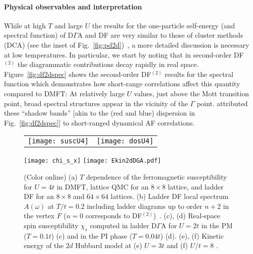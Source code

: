\documentclass[rmp,aps,reprint,amsmath,amssymb,superscriptaddress,showpacs,nofootinbib]{revtex4-1}
\begin{document}
\paragraph*{Physical observables and interpretation}

While at high $T$ and large $U$ the results for the one-particle self-energy (and spectral function) of D$\Gamma$A and DF are very similar to those of cluster methods (DCA) (see the inset of Fig.~\ref{fig:pd2d})~\cite{LeBlanc2015}, a more detailed discussion is necessary at low temperatures. In particular, we start by noting that in second-order  DF$^{(2)}$ the diagrammatic contributions decay rapidly in real space. Figure~\ref{fig:df2dspec} shows the second-order DF$^{(2)}$ results for the spectral function which demonstrates how short-range correlations affect this quantity compared to DMFT: At relatively large $U$ values, just above the Mott transition point, broad spectral structures appear in the vicinity of the $\Gamma$ point.  attributed these ``shadow bands''  [akin to the (red and blue) dispersion in  Fig.~\ref{fig:df2dspec}] to short-ranged dynamical AF correlations.

\begin{figure}[t]
\begin{tabular}{cc}
  \texttt{[image: suscU4]} & \hspace{-0.75em}\texttt{[image: dosU4]}
\end{tabular}
  \texttt{[image: chi\_s\_x]} 
  \texttt{[image: Ekin2dDGA.pdf]} 
    \caption{(Color online) (a) $T$ dependence of the  ferromagnetic susceptibility for $U=4t$ in DMFT, lattice QMC \cite{Moreo1993} for an $8\times 8$ lattice, and ladder DF for an $8\times 8$ and  $64\times 64$ lattices. (b) Ladder DF local spectrum $A(\omega)$ at $T/t=0.2$ including ladder diagrams up to order $n+2$ in the vertex $F$ ($n=0$ corresponds to DF$^{(2)}$)~\cite{Hafermannphd}. (c), (d) Real-space spin susceptibility $\chi_{s}$ computed in ladder D$\Gamma$A for $U=2t$ in the PM ($T=0.1t$) (c) and in the PI  phase ($T=0.04t$) (d). (e), (f) Kinetic energy of the $2d$ Hubbard model at (e) $U=3t$  and (f) $U/t=8$ \cite{Rohringer2016}.}
  \label{fig:observ2d}
\end{figure}
\end{document}
